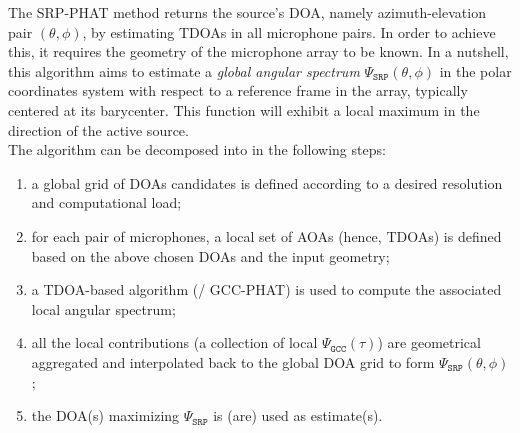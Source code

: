 \mynewline
The \ac{SRP-PHAT} method returns the source's \ac{DOA}, namely azimuth-elevation pair $(\theta, \phi)$, by estimating \acp{TDOA} in all microphone pairs.
In order to achieve this, it requires the geometry of the microphone array to be known.
In a nutshell, this algorithm aims to estimate a \textit{global angular spectrum} $\Psi_{\mathtt{SRP}}(\theta,\phi)$ in the polar coordinates system with respect to a reference frame in the array, typically centered at its barycenter.
This function will exhibit a local maximum in the direction of the active source.
\\The algorithm can be decomposed into in the following steps:
\begin{enumerate}
    \item a global grid of \acp{DOA} candidates is defined according to a desired resolution and computational load;
    \item for each pair of microphones, a local set of \acp{AOA} (hence, \acp{TDOA}) is defined based on the above chosen \acp{DOA} and the input geometry;
    \item a TDOA-based algorithm (\eg/ \ac{GCC-PHAT}) is used to compute the associated local angular spectrum;
    \item all the local contributions (a collection of local $\Psi_\mathtt{GCC}(\tau)$) are geometrical aggregated and interpolated back to the global \ac{DOA} grid to form $\Psi_{\mathtt{SRP}}(\theta,\phi)$;
    \item the \acs{DOA}(s) maximizing $\Psi_\mathtt{SRP}$ is (are) used as estimate(s).
\end{enumerate}

